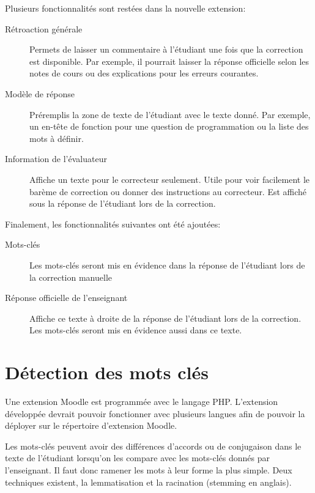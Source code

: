 Plusieurs fonctionnalités sont restées dans la nouvelle extension:

\begin{description}
  \item[Rétroaction générale]
  
  Permets de laisser un commentaire à l'étudiant une fois que la correction est disponible.
  Par exemple, il pourrait laisser la réponse officielle selon les notes de cours ou des explications pour les erreurs courantes.
  
  \item[Modèle de réponse]
  
  Préremplis la zone de texte de l'étudiant avec le texte donné.
  Par exemple, un en-tête de fonction pour une question de programmation ou la liste des mots à définir.
  
  \item[Information de l'évaluateur]
  
  Affiche un texte pour le correcteur seulement.
  Utile pour voir facilement le barème de correction ou donner des instructions au correcteur.
  Est affiché sous la réponse de l'étudiant lors de la correction.
\end{description}

Finalement, les fonctionnalités suivantes ont été ajoutées:

\begin{description}
  \item[Mots-clés]
  
  Les mots-clés seront mis en évidence dans la réponse de l'étudiant lors de la correction manuelle

  \item[Réponse officielle de l'enseignant]
  
  Affiche ce texte à droite de la réponse de l'étudiant lors de la correction.
  Les mots-clés seront mis en évidence aussi dans ce texte.
\end{description}

\section{Détection des mots clés}

Une extension Moodle est programmée avec le langage PHP.
L'extension développée devrait pouvoir fonctionner avec plusieurs langues afin de pouvoir la déployer sur le répertoire d'extension Moodle.

Les mots-clés peuvent avoir des différences d'accords ou de conjugaison dans le texte de l'étudiant lorsqu'on les compare avec les mots-clés donnés par l'enseignant.
Il faut donc ramener les mots à leur forme la plus simple.
Deux techniques existent, la lemmatisation et la racination (stemming en anglais).

